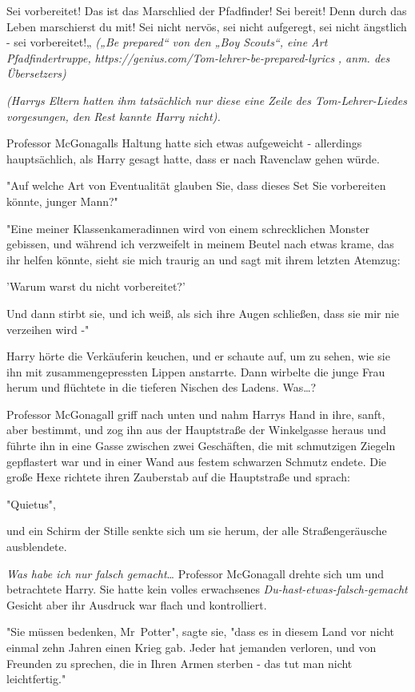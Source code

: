{Sei vorbereitet! Das ist das Marschlied der Pfadfinder! Sei bereit! Denn durch das Leben marschierst du mit! Sei nicht nervös, sei nicht aufgeregt, sei nicht ängstlich - sei vorbereitet!„ \emph{(„Be prepared“ von den „Boy Scouts“, eine Art Pfadfindertruppe,} \emph{https://genius.com/Tom-lehrer-be-prepared-lyrics} \emph{, anm. des Übersetzers)}

\emph{(Harrys Eltern hatten ihm tatsächlich nur diese eine Zeile des Tom-Lehrer-Liedes vorgesungen, den Rest kannte Harry nicht).}

Professor McGonagalls Haltung hatte sich etwas aufgeweicht - allerdings hauptsächlich, als Harry gesagt hatte, dass er nach Ravenclaw gehen würde.

"Auf welche Art von Eventualität glauben Sie, dass dieses Set Sie vorbereiten könnte, junger Mann?"

"Eine meiner Klassenkameradinnen wird von einem schrecklichen Monster gebissen, und während ich verzweifelt in meinem Beutel nach etwas krame, das ihr helfen könnte, sieht sie mich traurig an und sagt mit ihrem letzten Atemzug:

'Warum warst du nicht vorbereitet?'

Und dann stirbt sie, und ich weiß, als sich ihre Augen schließen, dass sie mir nie verzeihen wird -"

Harry hörte die Verkäuferin keuchen, und er schaute auf, um zu sehen, wie sie ihn mit zusammengepressten Lippen anstarrte. Dann wirbelte die junge Frau herum und flüchtete in die tieferen Nischen des Ladens. Was…?

Professor McGonagall griff nach unten und nahm Harrys Hand in ihre, sanft, aber bestimmt, und zog ihn aus der Hauptstraße der Winkelgasse heraus und führte ihn in eine Gasse zwischen zwei Geschäften, die mit schmutzigen Ziegeln gepflastert war und in einer Wand aus festem schwarzen Schmutz endete. Die große Hexe richtete ihren Zauberstab auf die Hauptstraße und sprach:

"Quietus",

und ein Schirm der Stille senkte sich um sie herum, der alle Straßengeräusche ausblendete.

\emph{Was habe ich nur falsch gemacht}… Professor McGonagall drehte sich um und betrachtete Harry. Sie hatte kein volles erwachsenes \emph{Du-hast-etwas-falsch-gemacht} Gesicht aber ihr Ausdruck war flach und kontrolliert.

"Sie müssen bedenken, Mr~Potter", sagte sie, "dass es in diesem Land vor nicht einmal zehn Jahren einen Krieg gab. Jeder hat jemanden verloren, und von Freunden zu sprechen, die in Ihren Armen sterben - das tut man nicht leichtfertig."

}
